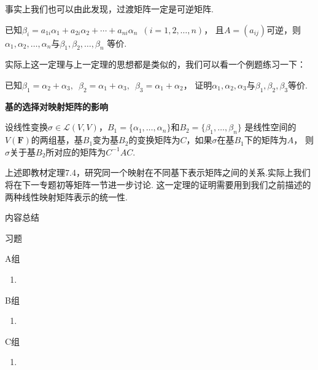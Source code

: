 事实上我们也可以由此发现，过渡矩阵一定是可逆矩阵.
\begin{theorem}
    已知$\beta_i=a_{1i}\alpha_1+a_{2i}\alpha_2+\cdots+a_{ni}\alpha_n\enspace(i=1,2,\ldots,n)$，
    且$A=(a_{ij})$可逆，则$\alpha_1,\alpha_2,\ldots,\alpha_n$与$\beta_1,\beta_2,\ldots,\beta_n$
    等价.
\end{theorem}
实际上这一定理与上一定理的思想都是类似的，我们可以看一个例题练习一下：
\begin{example}
    已知$\beta_1=\alpha_2+\alpha_3,\enspace\beta_2=\alpha_1+\alpha_3,\enspace\beta_3=\alpha_1+\alpha_2$，
    证明$\alpha_1,\alpha_2,\alpha_3$与$\beta_1,\beta_2,\beta_3$等价.
\end{example}
\begin{theorem}
    \textbf{\heiti 基的选择对映射矩阵的影响}

    设线性变换$\sigma \in \mathcal{L}(V,V)$，$B_1=\{\alpha_1,\ldots,\alpha_n\}$和$B_2=\{\beta_1,\ldots,\beta_n\}$
    是线性空间的$V(\mathbf{F})$的两组基，基$B_1$变为基$B_2$的变换矩阵为$C$，如果$\sigma$在基$B_1$下的矩阵为$A$，
    则$\sigma$关于基$B_2$所对应的矩阵为$C^{-1}AC$.
\end{theorem}
上述即教材定理7.4，研究同一个映射在不同基下表示矩阵之间的关系.实际上我们将在下一专题初等矩阵一节进一步讨论.
这一定理的证明需要用到我们之前描述的两种线性映射矩阵表示的统一性.

\vspace{2ex}
\centerline{\heiti \Large 内容总结}

\vspace{2ex}

\centerline{\heiti \Large 习题}
\vspace{2ex}
{\kaishu }
\begin{flushright}
    \kaishu

\end{flushright}
\centerline{\heiti A组}
\begin{enumerate}
    \item
\end{enumerate}
\centerline{\heiti B组}
\begin{enumerate}
    \item
\end{enumerate}
\centerline{\heiti C组}
\begin{enumerate}
    \item
\end{enumerate}

